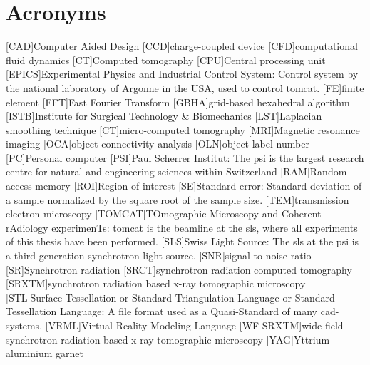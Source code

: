     \chapter*{Acronyms}
	\begin{acronym}[ACRONYM]
		[CAD]{Computer Aided Design}
		[CCD]{charge-coupled device}
		[CFD]{computational fluid dynamics}
		[CT]{Computed tomography}
		[CPU]{Central processing unit}
		[EPICS]{Experimental Physics and Industrial Control System}: Control system by the national laboratory of \href{http://www.aps.anl.gov/epics/}{Argonne in the USA}, used to control \acs{tomcat}.
		[FE]{finite element}
		[FFT]{Fast Fourier Transform}
		{grid-based hexahedral algorithm}
		{Institute for Surgical Technology \& Biomechanics}
		[LST]{Laplacian smoothing technique}
		[\micro CT]{micro-computed tomography}
		[MRI]{Magnetic resonance imaging}
		[OCA]{object connectivity analysis}
		[OLN]{object label number}
		[PC]{Personal computer}
		[PSI]{Paul Scherrer Institut}: The \acs{psi} is the largest research centre for natural and engineering sciences within Switzerland
		[RAM]{Random-access memory}
		[ROI]{Region of interest}
		[SE]{Standard error}: Standard deviation of a sample normalized by the square root of the sample size.
		[TEM]{transmission electron microscopy}
		[TOMCAT]{TOmographic Microscopy and Coherent rAdiology experimenTs}: \acs{tomcat} is the beamline at the \acs{sls}, where all experiments of this thesis have been performed.
		[SLS]{Swiss Light Source}: The \acs{sls} at the \acs{psi} is a third-generation synchrotron light source.
		[SNR]{signal-to-noise ratio}
		[SR]{Synchrotron radiation}
		{synchrotron radiation computed tomography}
		[SRXTM]{synchrotron radiation based x-ray tomographic microscopy}
		[STL]{Surface Tessellation or Standard Triangulation Language or Standard Tessellation Language}: A file format used as a Quasi-Standard of many \acs{cad}-systems.
		{Virtual Reality Modeling Language}
		[WF-SRXTM]{wide field synchrotron radiation based x-ray tomographic microscopy}
		[YAG]{Yttrium aluminium garnet}
	\end{acronym}
\endgroup

\cleardoublepage